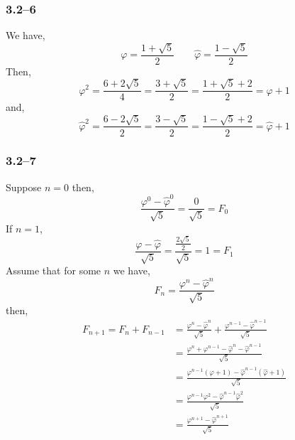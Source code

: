 \subsubsection*{3.2--6}

We have,
\begin{equation*}
	\varphi = \frac{1+\sqrt{5}}{2}\qquad \hat{\varphi} = \frac{1-\sqrt{5}}{2}
\end{equation*}
Then,
\begin{equation*}
	\varphi^{2} = \frac{6+2\sqrt{5}}{4} = \frac{3 + \sqrt{5}}{2} = \frac{1 + \sqrt{5} + 2}{2} = \varphi + 1
\end{equation*}
and,
\begin{equation*}
	\hat{\varphi}^{2} = \frac{6 - 2\sqrt{5}}{2} = \frac{3 - \sqrt{5}}{2} = \frac{1 - \sqrt{5} + 2}{2} = \hat{\varphi} + 1
\end{equation*}

\subsubsection*{3.2--7}

Suppose $n=0$ then,
\begin{equation*}
	\frac{\varphi^{0} - \hat{\varphi}^{0}}{\sqrt{5}} = \frac{0}{\sqrt{5}} = F_{0}
\end{equation*}
If $n=1$,
\begin{equation*}
	\frac{\varphi - \hat{\varphi}}{\sqrt{5}} = \frac{\frac{2\sqrt{5}}{2}}{\sqrt{5}} = 1 = F_{1}
\end{equation*}
Assume that for some $n$ we have,
\begin{equation*}
	F_{n} = \frac{\varphi^{n} - \hat{\varphi}^{n}}{\sqrt{5}}
\end{equation*}
then,
\begin{equation*}
	\begin{aligned}
		F_{n+1} = F_{n} + F_{n-1} &= \frac{\varphi^{n} - \hat{\varphi}^{n}}{\sqrt{5}} + \frac{\varphi^{n-1} - \hat{\varphi}^{n-1}}{\sqrt{5}}\\
		&= \frac{\varphi^{n} + \varphi^{n-1} - \hat{\varphi}^{n} - \hat{\varphi}^{n-1}}{\sqrt{5}}\\
		&= \frac{\varphi^{n-1}(\varphi + 1) - \hat{\varphi}^{n-1}(\hat{\varphi}+1)}{\sqrt{5}}\\
		&= \frac{\varphi^{n-1}\varphi^{2} - \hat{\varphi}^{n-1}\hat{\varphi}^{2}}{\sqrt{5}}\\
		&= \frac{\varphi^{n+1} - \hat{\varphi}^{n+1}}{\sqrt{5}}
	\end{aligned}
\end{equation*}

